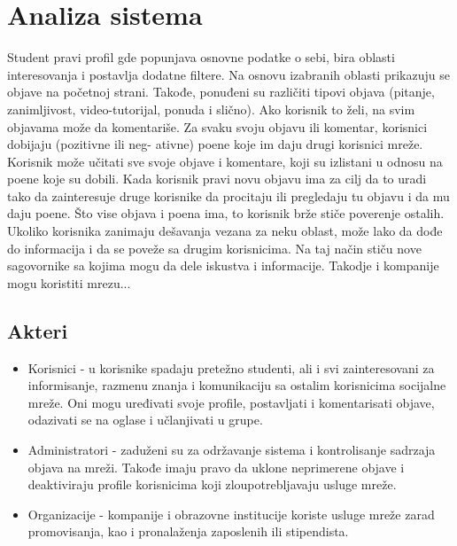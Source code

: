 \section{Analiza sistema}

Student pravi profil gde popunjava osnovne podatke o sebi, bira oblasti interesovanja i postavlja dodatne filtere. Na osnovu izabranih oblasti prikazuju se objave na početnoj strani. Takođe, ponuđeni
su različiti tipovi objava (pitanje, zanimljivost, video-tutorijal, ponuda i slično).
Ako korisnik to želi, na svim objavama može da komentariše.
Za svaku svoju objavu ili komentar, korisnici dobijaju (pozitivne ili neg-
ativne) poene koje im daju drugi korisnici mreže. Korisnik može
učitati sve svoje objave i komentare, koji su izlistani u odnosu na poene koje
su dobili. Kada korisnik pravi novu objavu ima za cilj da to uradi tako da
zainteresuje druge korisnike da procitaju ili pregledaju tu objavu i da mu
daju poene. Što vise objava i poena ima, to korisnik brže stiče poverenje
ostalih.
Ukoliko korisnika zanimaju dešavanja vezana za neku oblast, može lako da dođe do informacija i da se poveže sa drugim korisnicima. Na taj način stiču nove sagovornike sa kojima mogu da dele iskustva i informacije. Takodje i kompanije mogu koristiti mrezu...

\subsection{Akteri}
\begin{itemize}
    \item Korisnici - u korisnike spadaju pretežno studenti, ali i svi zainteresovani za informisanje, razmenu znanja i komunikaciju sa ostalim korisnicima socijalne mreže. Oni mogu uređivati svoje profile, postavljati i komentarisati objave, odazivati se na oglase i učlanjivati u grupe.
    \item Administratori - zaduženi su za održavanje sistema i kontrolisanje sadrzaja objava na mreži. Takođe imaju pravo da uklone neprimerene objave i deaktiviraju profile korisnicima koji zloupotrebljavaju usluge mreže.
    \item Organizacije - kompanije i obrazovne institucije koriste usluge mreže zarad promovisanja, kao i  pronalaženja zaposlenih ili stipendista.
\end{itemize}

